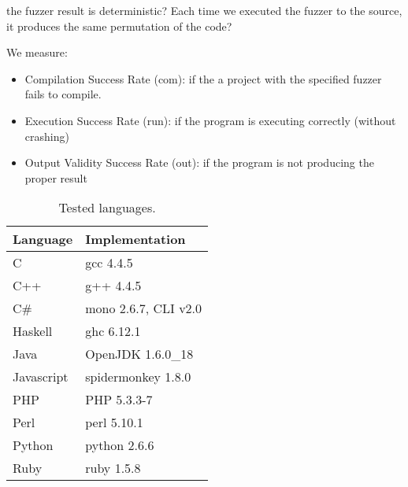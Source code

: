 \documentclass[10pt]{sigplanconf}
\begin{document}
the fuzzer result is deterministic? Each time we executed the fuzzer to the source, it produces the same permutation of the code?

We measure:

\begin{itemize}
	\item Compilation Success Rate (com): if the a project with the specified fuzzer fails to compile.
	\item Execution Success Rate (run): if the program is executing correctly (without crashing)
	\item Output Validity Success Rate (out): if the program is not producing the proper result
\end{itemize}

\begin{table}
\begin{center}
\caption{Tested languages.}
\label{tab:langs}
\begin{tabular}{ l l}
 \hline
Language & Implementation \\
\hline
C 			& gcc 4.4.5 \\
C++ 		& g++ 4.4.5 \\
C\# 		& mono 2.6.7, CLI v2.0 \\
Haskell 	& ghc 6.12.1 \\
Java 		& OpenJDK 1.6.0\_18 \\
Javascript 	& spidermonkey 1.8.0 \\
PHP 		& PHP 5.3.3-7 \\
Perl 		& perl 5.10.1 \\
Python 		& python 2.6.6 \\
Ruby 		& ruby 1.5.8 \\
\hline
\end{tabular}
\end{center}
\end{table}
\end{document}
